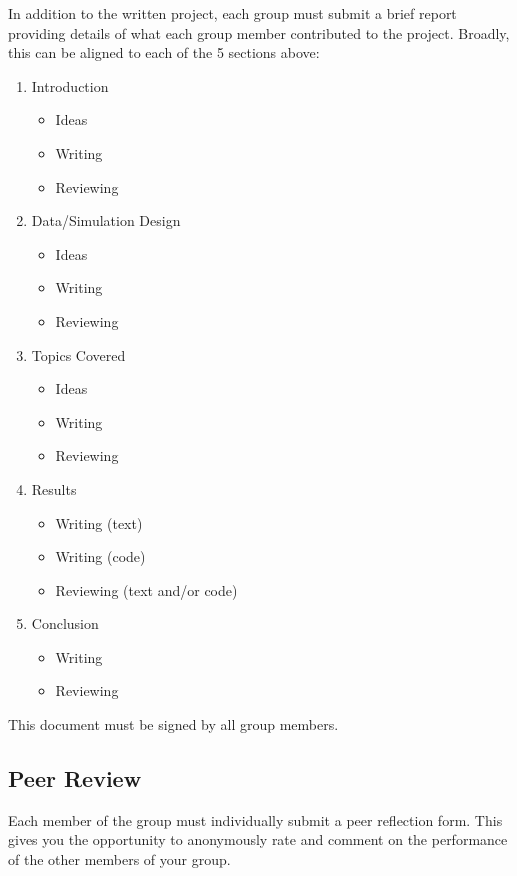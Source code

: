 \documentclass[10pt]{article}
\begin{document}
In addition to the written project, each group must submit a brief report providing details of what each group member contributed to the project. Broadly, this can be aligned to each of the 5 sections above:

\begin{enumerate}[noitemsep]
    \item Introduction
    \begin{itemize}
        \item Ideas
        \item Writing
        \item Reviewing
    \end{itemize}
    \item Data/Simulation Design
    \begin{itemize}
        \item Ideas
        \item Writing
        \item Reviewing
    \end{itemize}
    \item Topics Covered
    \begin{itemize}
        \item Ideas
        \item Writing
        \item Reviewing
    \end{itemize}
    \item Results
    \begin{itemize}
        \item Writing (text)
        \item Writing (code)
        \item Reviewing (text and/or code)
    \end{itemize}
    \item Conclusion
    \begin{itemize}
        \item Writing
        \item Reviewing
    \end{itemize}
\end{enumerate}

This document must be signed by all group members.

\subsection*{Peer Review}

Each member of the group must individually submit a peer reflection form. This gives you the opportunity to anonymously rate and comment on the performance of the other members of your group.
\end{document}
